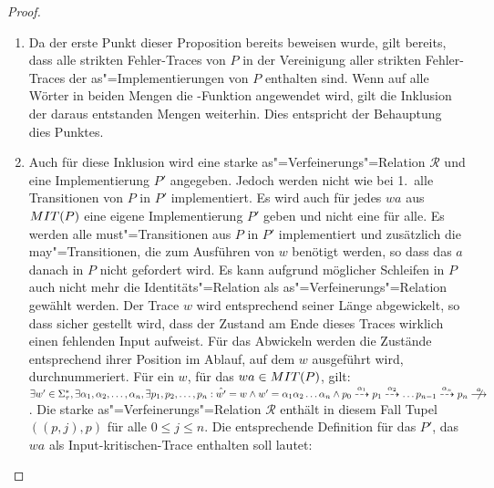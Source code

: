 \begin{proof}
\begin{enumerate}
    \item Da der erste Punkt dieser Proposition bereits beweisen wurde, gilt
      bereits, dass alle strikten Fehler-Traces von $P$ in der Vereinigung
      aller strikten Fehler-Traces der as"=Implementierungen von $P$ enthalten
      sind. Wenn auf alle Wörter in beiden Mengen die \prune{}-Funktion
      angewendet wird, gilt die Inklusion der daraus entstanden Mengen
      weiterhin. Dies entspricht der Behauptung dies Punktes.
    \item Auch für diese Inklusion wird eine starke as"=Verfeinerungs"=Relation
      $\mathcal{R}$ und eine Implementierung $P'$ angegeben. Jedoch werden
      nicht wie bei 1.\ alle Transitionen von $P$ in $P'$ implementiert. Es
      wird auch für jedes $wa$ aus $MIT (P)$ eine eigene Implementierung $P'$
      geben und nicht eine für alle. Es werden alle must"=Transitionen aus $P$
      in $P'$ implementiert und zusätzlich die may"=Transitionen, die zum
      Ausführen von $w$ benötigt werden, so dass das $a$ danach in $P$ nicht
      gefordert wird. Es kann aufgrund möglicher Schleifen in $P$ auch nicht
      mehr die Identitäts"=Relation als as"=Verfeinerungs"=Relation gewählt
      werden. Der Trace $w$ wird entsprechend seiner Länge abgewickelt, so dass
      sicher gestellt wird, dass der Zustand am Ende dieses Traces wirklich
      einen fehlenden Input aufweist. Für das Abwickeln werden die Zustände
      entsprechend ihrer Position im Ablauf, auf dem $w$ ausgeführt wird,
      durchnummeriert. Für ein $w$, für das $wa\in MIT (P)$, gilt: $\exists
      w'\in\Sigma _{\tau} ^*, \exists \alpha _1,\alpha _2,\dots ,\alpha _n,
      \exists p_1,p_2,\dots ,p_n: \hat{w'} = w\land w'=\alpha _1\alpha _2\dots
      \alpha _n\land p_0 \may[\alpha _1] p_1 \may[\alpha _2] \dots
      p_{n-1}\may[\alpha _n] p_n \nmust[a]$.
      Die starke as"=Verfeinerungs"=Relation $\mathcal{R}$ enthält in diesem
      Fall Tupel $((p,j),p)$ für alle $0\leq j \leq n$. Die entsprechende
      Definition für das $P'$, das $wa$ als Input-kritischen-Trace enthalten
      soll lautet:
\end{enumerate}
\end{proof}
